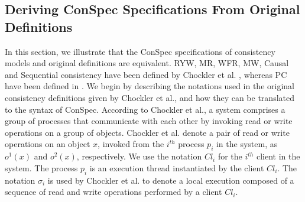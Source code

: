 \documentclass[journal,compsoc]{IEEEtran}
\begin{document}
 \subsection{Deriving ConSpec Specifications From Original Definitions}\label{sec:derive}
   In this section, %
  we illustrate that %
  the ConSpec specifications of  consistency models  and original definitions \cite{Chockler2000, Ahamad:1993:PPC:165231.165264, Owens:2009:BXM:1616077.1616107} are equivalent.  RYW, MR, WFR, MW, Causal and Sequential consistency have been defined by Chockler et al. \cite{Chockler2000}, whereas PC have been defined in \cite{Ahamad:1993:PPC:165231.165264, Owens:2009:BXM:1616077.1616107}.
   We begin by describing the  notations used in the original consistency definitions given by Chockler et al., and how they can be translated to %
  the syntax of ConSpec.  According to Chockler et al., a system comprises a group of processes that communicate with each other by invoking read or write operations on a group of objects.
  Chockler et al. denote   a pair of  read or write operations on an object $x$, invoked from %
 the $i^{th}$  process $ p_i$ in the system, as $\mathit{o}^1(x)$ and
 $\mathit{o}^2(x)$, respectively. %
We use the notation $\mathit{Cl}_i$ for the $i^{th}$ client in the system. The process $ p_i$ is an execution thread instantiated by the client $\mathit{Cl}_i$. %
  The
  notation $\sigma_i$ is used by Chockler et al. to denote a local execution composed of a sequence of read and write operations  performed by  a client $\mathit{Cl}_i$. %
\end{document}
